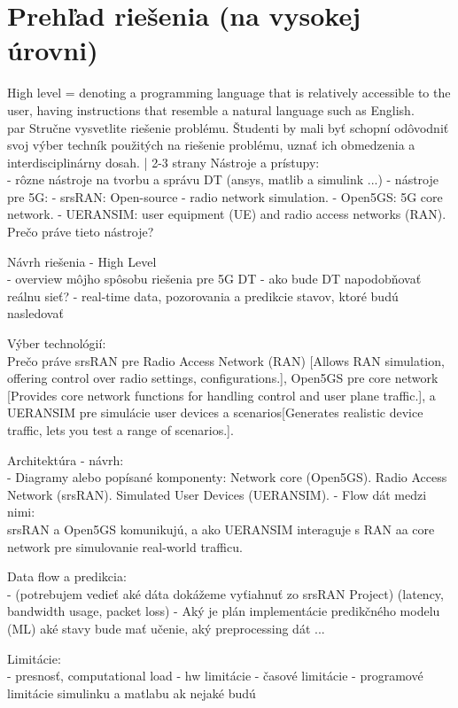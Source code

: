 \section{Prehľad riešenia (na vysokej úrovni)}
\par{
High level = denoting a programming language that is relatively accessible to the user, having instructions that resemble a natural language such as English.
}
\\ 
par{
Stručne vysvetlite riešenie problému. Študenti by mali byť schopní odôvodniť svoj výber techník použitých na riešenie problému, uznať ich obmedzenia a interdisciplinárny dosah. | 2-3 strany
}
Nástroje a prístupy:  \\
- rôzne nástroje na tvorbu a správu DT (ansys, matlib a simulink ...)
- nástroje pre 5G:
    - srsRAN: Open-source - radio network simulation.
    - Open5GS: 5G core network.
    - UERANSIM: user equipment (UE) and radio access networks (RAN).
Prečo práve tieto nástroje?
\par{
Návrh riešenia - High Level \\
- overview môjho spôsobu riešenia pre 5G DT
- ako bude DT napodobňovať reálnu sieť? - real-time data, pozorovania a predikcie stavov, ktoré budú nasledovať

Výber technológií: \\
Prečo práve srsRAN pre Radio Access Network (RAN) [Allows RAN simulation, offering control over radio settings, configurations.], 
Open5GS pre core network [Provides core network functions for handling control and user plane traffic.], 
a UERANSIM pre simulácie user devices a scenarios[Generates realistic device traffic, lets you test a range of scenarios.].

Architektúra - návrh: \\
- Diagramy alebo popísané komponenty:
Network core (Open5GS).
Radio Access Network (srsRAN).
Simulated User Devices (UERANSIM).
- Flow dát medzi nimi: \\
srsRAN a Open5GS komunikujú, a ako UERANSIM interaguje s RAN aa core network pre simulovanie real-world trafficu.

Data flow a predikcia: \\
- (potrebujem vedieť aké dáta dokážeme vyťiahnuť zo srsRAN Project) (latency, bandwidth usage, packet loss)
- Aký je plán implementácie predikčného modelu (ML) aké stavy bude mať učenie, aký preprocessing dát ... 


Limitácie: \\
- presnosť, computational load
- hw limitácie
- časové limitácie
- programové limitácie simulinku a matlabu ak nejaké budú
}

